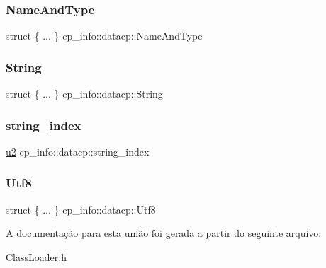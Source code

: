 \subsubsection{\texorpdfstring{Name\+And\+Type}{NameAndType}}
{\footnotesize\ttfamily struct \{ ... \}  cp\+\_\+info\+::datacp\+::\+Name\+And\+Type}

\mbox{\label{unioncp__info_1_1datacp_aaf4057ca7dfbb3d88679bc5bd2477a48}} 
\subsubsection{\texorpdfstring{String}{String}}
{\footnotesize\ttfamily struct \{ ... \}  cp\+\_\+info\+::datacp\+::\+String}

\mbox{\label{unioncp__info_1_1datacp_af0c3e4590189a854d4c52d70464571cf}} 
\subsubsection{\texorpdfstring{string\+\_\+index}{string\_index}}
{\footnotesize\ttfamily \hyperlink{ClassLoader_8h_a5f223212eef04d10a4550ded680cb1cf}{u2} cp\+\_\+info\+::datacp\+::string\+\_\+index}

\mbox{\label{unioncp__info_1_1datacp_aa0571418fb804e2f3c2f849eb75142e4}} 
\subsubsection{\texorpdfstring{Utf8}{Utf8}}
{\footnotesize\ttfamily struct \{ ... \}  cp\+\_\+info\+::datacp\+::\+Utf8}



A documentação para esta união foi gerada a partir do seguinte arquivo\+:\begin{DoxyCompactItemize}
\item 
\hyperlink{ClassLoader_8h}{Class\+Loader.\+h}\end{DoxyCompactItemize}
